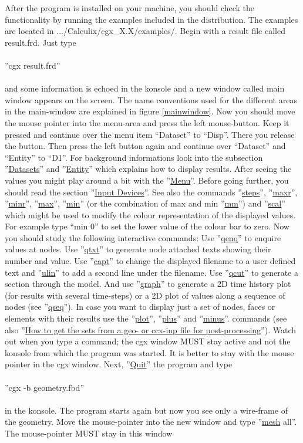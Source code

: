 \documentclass{article}
\providecommand{\htmlref}[2]{\hyperref[#2]{#1}}
\begin{document}
After the program is installed on your machine, you should check the functionality by running the examples included in the distribution. The examples are located in .../Calculix/cgx\_X.X/examples/. Begin with a result file called result.frd. Just type\\\\  ''cgx result.frd''\\\\and some information is echoed in the konsole and a new window called main window appears on the screen. The name conventions used for the different areas in the main-window are explained in figure \ref{mainwindow}. Now you should move the mouse pointer into the menu-area and press the left mouse-button. Keep it pressed and continue over the menu item ``Dataset'' to ``Disp''. There you release the button. Then press the left button again and continue over ``Dataset'' and ``Entity'' to ``D1''. For background informations look into the subsection ''\htmlref{Datasets}{Datasets}'' and ''\htmlref{Entity}{Entity}'' which explains how to display results. After seeing the values you might play around a bit with the ''\htmlref{Menu}{Menu}''. Before going further, you should read the section ''\htmlref{Input Devices}{Input Devices}''. See also the commands ''\htmlref{steps}{steps}'', ''\htmlref{maxr}{maxr}'', ''\htmlref{minr}{minr}'', ''\htmlref{max}{max}'', ''\htmlref{min}{min}'' (or the combination of max and min ''\htmlref{mm}{mm}'') and ''\htmlref{scal}{scal}'' which might be used to modify the colour representation of the displayed values. For example type ``min 0'' to set the lower value of the colour bar to zero. Now you should study the following interactive commands: Use ''\htmlref{qenq}{qenq}'' to enquire values at nodes. Use ''\htmlref{qtxt}{qtxt}'' to generate node attached texts showing their number and value. Use ''\htmlref{capt}{capt}'' to change the displayed filename to a user defined text and ''\htmlref{ulin}{ulin}'' to add a second line under the filename. Use ''\htmlref{qcut}{qcut}'' to generate a section through the model. And use ''\htmlref{graph}{graph}'' to generate a 2D time history plot (for results with several time-steps) or a 2D plot of values along a sequence of nodes (see ''\htmlref{qseq}{qseq}''). In case you want to display just a set of nodes, faces or elements with their results use the ''\htmlref{plot}{plot}'', ''\htmlref{plus}{plus}'' and ''\htmlref{minus}{minus}''. commands (see also ''\htmlref{How to get the sets from a geo- or ccx-inp file for post-processing}{How to get the sets from a geo- or ccx-inp file for post-processing}'').  Watch out when you type a command; the cgx window MUST stay active and not the konsole from which the program was started. It is better to stay with the mouse pointer in the cgx window. Next, ''\htmlref{Quit}{Quit}'' the program and type\\\\  ''cgx -b geometry.fbd''\\\\in the konsole. The program starts again but now you see only a wire-frame of the geometry. Move the mouse-pointer into the new window and type ''\htmlref{mesh}{mesh} all''. The mouse-pointer MUST stay in this window 
\end{document}
